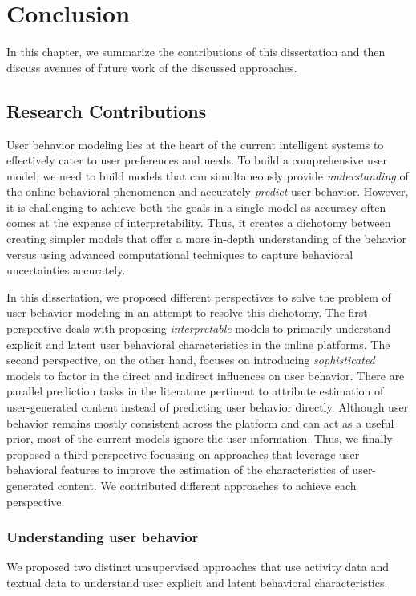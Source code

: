 \chapter{Conclusion}
\label{chap:concl}
In this chapter, we summarize the contributions of this dissertation and then discuss avenues of future work of the discussed approaches.
\section{Research Contributions}
User behavior modeling lies at the heart of the current intelligent systems to effectively cater to user preferences and needs. To build a comprehensive user model, we need to build models that can simultaneously provide \emph{understanding} of the online behavioral phenomenon and accurately \emph{predict} user behavior. However, it is challenging to achieve both the goals in a single model as accuracy often comes at the expense of interpretability.
Thus, it creates a dichotomy between creating simpler models that offer a more in-depth understanding of the behavior versus using advanced computational techniques to capture behavioral uncertainties accurately.

In this dissertation, we proposed different perspectives to solve the problem of user behavior modeling in an attempt to resolve this dichotomy. The first perspective deals with proposing \emph{interpretable} models to primarily understand explicit and latent user behavioral characteristics in the online platforms. The second perspective, on the other hand,  focuses on introducing \emph{sophisticated} models to factor in the direct and indirect influences on user behavior.
There are parallel prediction tasks in the literature pertinent to attribute estimation of user-generated content instead of predicting user behavior directly. Although user behavior remains mostly consistent across the platform and can act as a useful prior, most of the current models ignore the user information.
Thus, we finally proposed a third perspective focussing on approaches that leverage user behavioral features to improve the estimation of the characteristics of user-generated content. We contributed different approaches to achieve each perspective.

\subsection{Understanding user behavior}
We proposed two distinct unsupervised approaches that use activity data and textual data to understand user explicit and latent behavioral characteristics.

